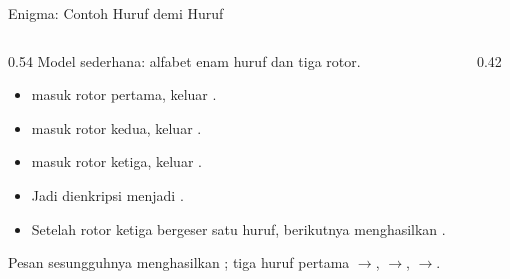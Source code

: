\documentclass[aspectratio=169,11pt]{beamer}
\begin{document}
\begin{frame}{Enigma: Contoh Huruf demi Huruf}
    \begin{columns}[T,onlytextwidth]
        \begin{column}{0.54\textwidth}
            \footnotesize
            Model sederhana: alfabet enam huruf dan tiga rotor.
            \begin{itemize}
                \item {} masuk rotor pertama, keluar .
                \item {} masuk rotor kedua, keluar .
                \item {} masuk rotor ketiga, keluar .
                \item Jadi  dienkripsi menjadi .
                \item Setelah rotor ketiga bergeser satu huruf, 
                      berikutnya menghasilkan .
            \end{itemize}
            \begin{exampleblock}{Pesan sesungguhnya}
                \footnotesize
                 menghasilkan
                ; tiga huruf pertama
                $\rightarrow$,
                $\rightarrow$,
                $\rightarrow$.
            \end{exampleblock}
        \end{column}
        \begin{column}{0.42\textwidth}
            \centering
        \end{column}
    \end{columns}
\end{frame}
\end{document}
